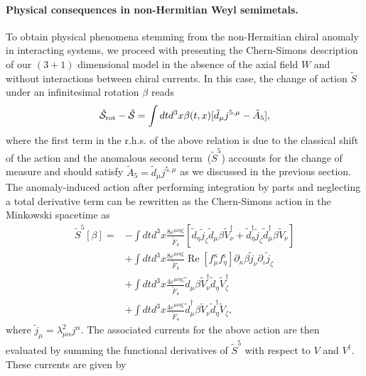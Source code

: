 \documentclass[prl,aps,showpacs,twocolumn,preprintnumbers,
amsmath,amssymb,superscriptaddress,longbibliography]{revtex4-1}
\renewcommand{\Re}{\mathop{\mathrm{Re}}}
\begin{document}
\paragraph*{Physical consequences in non-Hermitian Weyl semimetals.}
To obtain physical phenomena stemming from the non-Hermitian chiral anomaly in interacting systems, we proceed with presenting the Chern-Simons description of our $(3+1)$ dimensional model in the absence of the axial field $W$ and without interactions between chiral currents. In this case, the change of action $\tilde{S}$ under an infinitesimal rotation $\beta$ reads
\begin{align}
    \tilde{\cal S}_{\rm rot} - \tilde{\cal S} = \int d t d^{3} x \beta(t,x) [\tilde{d}_{\mu} j^{5,\mu} - \tilde{A}_{5}],
\end{align}
where the first term in the r.h.s. of the above relation is due to the classical shift of the action and the anomalous second term~($\tilde{S}^{5}$) accounts for the change of measure and should satisfy $\tilde{A}_{5}=\tilde{d}_{\mu} j^{5,\mu} $ as we discussed in the previous section. The anomaly-induced action after performing integration by parts and neglecting a total derivative term can be rewritten as the Chern-Simons action in the Minkowski spacetime as
\begin{align}
    \tilde{S}^{5}[\beta] = & - \int d t d^{3} x
     \frac{8\varepsilon^{\mu \nu \eta \zeta}}{\tilde{F}_{4}} 
     \left[
     \tilde{d}_{\eta} \tilde{j}_{\zeta} \tilde{d}_{\mu} \beta \tilde{V}^{\dagger}_{\nu}
+
     \tilde{d}^{\dagger}_{\eta} \tilde{j}_{\zeta} \tilde{d}^{\dagger}_{\mu} \beta \tilde{V}_{\nu}
     \right]
           \nonumber \\
     &
     + \int d t d^{3} x
     \frac{8\varepsilon^{\mu \nu \eta \zeta}}{\tilde{F}_{4}} 
     \Re[f_{\mu }^{ \kappa} f_{\eta }^{ \iota}]
   \partial_{\kappa} \beta \tilde{j}_{\nu} 
    \partial_{\iota} \tilde{j}_{\zeta} 
         \nonumber \\
     &
     +
    \int d t d^{3} x
     \frac{4\varepsilon^{\mu \nu \eta \zeta}}{\tilde{F}_{4}} 
     \tilde{d}_{\mu} \beta \tilde{V}^{\dagger}_{\nu} \tilde{d}_{\eta} \tilde{V}^{\dagger}_{\zeta}
     \nonumber \\
     &+ \int d t d^{3} x
     \frac{4\varepsilon^{\mu \nu \eta \zeta}}{\tilde{F}_{4}} 
     \tilde{d}^{\dagger}_{\mu} \beta \tilde{V}_{\nu} \tilde{d}^{\dagger}_{\eta} \tilde{V}_{\zeta},
\end{align}
where $\tilde{j}_{\mu} =\lambda^{2}_{\mu \alpha} j^{\alpha}$. The associated currents for the above action are then evaluated by summing the functional derivatives of $\tilde{S}^{5}$ with respect to $V$ and $V^{\dagger}$. These currents are given by
\end{document}
